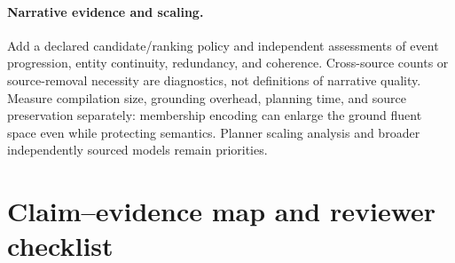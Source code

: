 \documentclass[letterpaper]{article}
\begin{document}
\paragraph{Narrative evidence and scaling.}
Add a declared candidate/ranking policy and independent assessments of event progression, entity continuity, redundancy, and coherence. Cross-source counts or source-removal necessity are diagnostics, not definitions of narrative quality. Measure compilation size, grounding overhead, planning time, and source preservation separately: membership encoding can enlarge the ground fluent space even while protecting semantics. Planner scaling analysis and broader independently sourced models remain priorities.

\section{Claim--evidence map and reviewer checklist}
\end{document}
